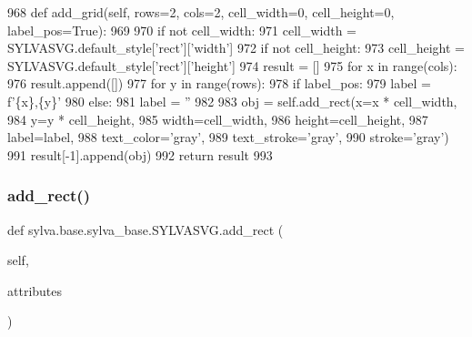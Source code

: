 \begin{DoxyCode}
968     \textcolor{keyword}{def }add\_grid(self, rows=2, cols=2, cell\_width=0, cell\_height=0, label\_pos=True):
969 
970         \textcolor{keywordflow}{if} \textcolor{keywordflow}{not} cell\_width:
971             cell\_width = SYLVASVG.default\_style[\textcolor{stringliteral}{'rect'}][\textcolor{stringliteral}{'width'}]
972         \textcolor{keywordflow}{if} \textcolor{keywordflow}{not} cell\_height:
973             cell\_height = SYLVASVG.default\_style[\textcolor{stringliteral}{'rect'}][\textcolor{stringliteral}{'height'}]
974         result = []
975         \textcolor{keywordflow}{for} x \textcolor{keywordflow}{in} range(cols):
976             result.append([])
977             \textcolor{keywordflow}{for} y \textcolor{keywordflow}{in} range(rows):
978                 \textcolor{keywordflow}{if} label\_pos:
979                     label = f\textcolor{stringliteral}{'\{x\},\{y\}'}
980                 \textcolor{keywordflow}{else}:
981                     label = \textcolor{stringliteral}{''}
982 
983                 obj = self.add\_rect(x=x * cell\_width,
984                                     y=y * cell\_height,
985                                     width=cell\_width,
986                                     height=cell\_height,
987                                     label=label,
988                                     text\_color=\textcolor{stringliteral}{'gray'},
989                                     text\_stroke=\textcolor{stringliteral}{'gray'},
990                                     stroke=\textcolor{stringliteral}{'gray'})
991                 result[-1].append(obj)
992         \textcolor{keywordflow}{return} result
993 
\end{DoxyCode}
\mbox{\label{classsylva_1_1base_1_1sylva__base_1_1_s_y_l_v_a_s_v_g_ab26401da507c1041bc8445bb31bfcd1d}} 
\subsubsection{\texorpdfstring{add\+\_\+rect()}{add\_rect()}}
{\footnotesize\ttfamily def sylva.\+base.\+sylva\+\_\+base.\+S\+Y\+L\+V\+A\+S\+V\+G.\+add\+\_\+rect (\begin{DoxyParamCaption}\item[{}]{self,  }\item[{}]{attributes }\end{DoxyParamCaption})}




